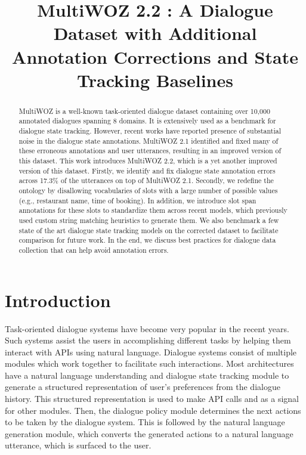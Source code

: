 \title{MultiWOZ 2.2 : A Dialogue Dataset with Additional Annotation Corrections and State Tracking Baselines}



\maketitle
\begin{abstract}
MultiWOZ \cite{budzianowski2018multiwoz} is a well-known task-oriented dialogue dataset containing over 10,000 annotated dialogues spanning 8 domains. It is extensively used as a benchmark for dialogue state tracking. However, recent works have reported presence of substantial noise in the dialogue state annotations. MultiWOZ 2.1 \cite{eric2019multiwoz} identified and fixed many of these erroneous annotations and user utterances, resulting in an improved version of this dataset. This work introduces MultiWOZ 2.2, which is a yet another improved version of this dataset. Firstly, we identify and fix dialogue state annotation errors across 17.3\% of the utterances on top of MultiWOZ 2.1. Secondly, we redefine the ontology by disallowing vocabularies of slots with a large number of possible values (e.g., restaurant name, time of booking). In addition, we introduce slot span annotations for these slots to standardize them across recent models, which previously used custom string matching heuristics to generate them. We also benchmark a few state of the art dialogue state tracking models on the corrected dataset to facilitate comparison for future work. In the end, we discuss best practices for dialogue data collection that can help avoid annotation errors. 
\end{abstract}

\section{Introduction}
Task-oriented dialogue systems have become very popular in the recent years. Such systems assist the users in accomplishing different tasks by helping them interact with APIs using natural language. Dialogue systems consist of multiple modules which work together to facilitate such interactions. Most architectures have a natural language understanding and dialogue state tracking module to generate a structured representation of user's preferences from the dialogue history. This structured representation is used to make API calls and as a signal for other modules. Then, the dialogue policy module determines the next actions to be taken by the dialogue system. This is followed by the natural language generation module, which converts the generated actions to a natural language utterance, which is surfaced to the user.

